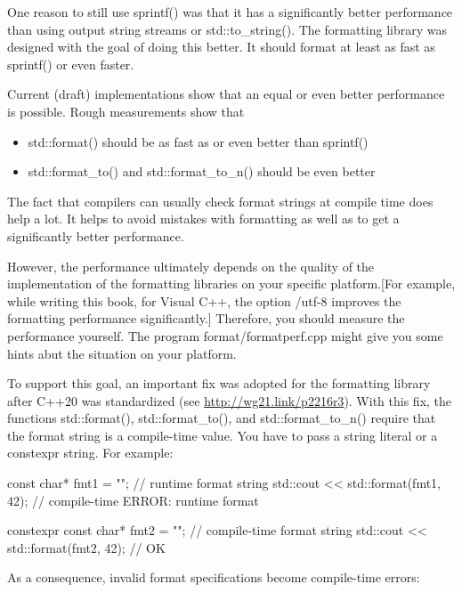 
One reason to still use sprintf() was that it has a significantly better performance than using output string streams or std::to\_string(). The formatting library was designed with the goal of doing this better. It should format at least as fast as sprintf() or even faster.

Current (draft) implementations show that an equal or even better performance is possible. Rough measurements show that

\begin{itemize}
\item 
std::format() should be as fast as or even better than sprintf()

\item 
std::format\_to() and std::format\_to\_n() should be even better
\end{itemize}

The fact that compilers can usually check format strings at compile time does help a lot. It helps to avoid mistakes with formatting as well as to get a significantly better performance.

However, the performance ultimately depends on the quality of the implementation of the formatting libraries on your specific platform.[For example, while writing this book, for Visual C++, the option /utf-8 improves the formatting performance significantly.] Therefore, you should measure the performance yourself. The program format/formatperf.cpp might give you some hints abut the situation on your platform.


To support this goal, an important fix was adopted for the formatting library after C++20 was standardized (see \url{http://wg21.link/p2216r3}). With this fix, the functions std::format(), std::format\_to(), and std::format\_to\_n() require that the format string is a compile-time value. You have to pass a string literal or a constexpr string. For example:

\begin{cpp}
const char* fmt1 = "{}\n"; // runtime format string
std::cout << std::format(fmt1, 42); // compile-time ERROR: runtime format

constexpr const char* fmt2 = "{}\n"; // compile-time format string
std::cout << std::format(fmt2, 42); // OK
\end{cpp}

As a consequence, invalid format specifications become compile-time errors:

